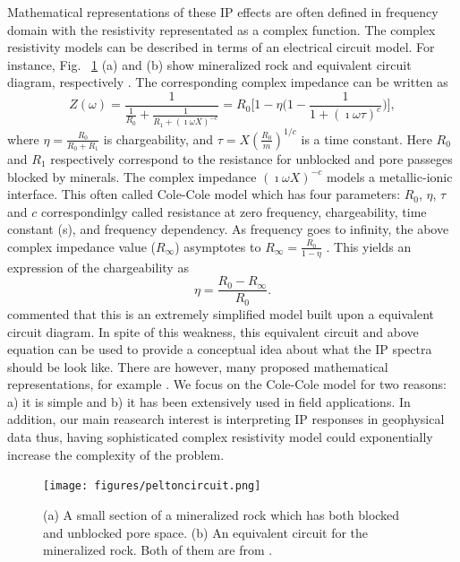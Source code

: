 \documentclass[letterpaper,11pt]{article}
\begin{document}
Mathematical representations of these IP effects are often defined in frequency domain with the resistivity representated as a complex function. The complex resistivity models can be described in terms of an electrical circuit model. For instance, Fig. ~\ref{Fig:peltoncircuit} (a) and (b) show mineralized rock and equivalent circuit diagram, respectively \cite{Pelton1978}. The corresponding complex impedance can be written as 
\begin{equation}
  Z(\omega) = \frac{1}{\frac{1}{R_0}+\frac{1}{R_1+(\imath\omega X)^{-c}}}=R_0 \Big[1 - \eta \Big(1-\frac{1}{1+(\imath\omega\tau)^c}\Big) \Big],
\end{equation}
where $\eta = \frac{R_0}{R_0+R_1}$ is chargeability, and $\tau=X(\frac{R_0}{m})^{1/c}$ is a time constant. Here $R_0$ and $R_1$ respectively correspond to the resistance for unblocked and pore passeges blocked by minerals. The complex impedance $(\imath \omega X)^{-c}$ models a metallic-ionic interface. This often called Cole-Cole model which has four parameters: $R_0$, $\eta$, $\tau$ and $c$ correspondinlgy called resistance at zero frequency, chargeability, time constant (s), and frequency dependency. As frequency goes to infinity, the above complex impedance value ($R_{\infty}$) asymptotes to $R_{\infty} = \frac{R_0}{1-\eta}$ . This yields an expression of the chargeability as 
\begin{equation}
  \eta = \frac{R_0-R_{\infty}}{R_0}.
\end{equation}
\cite{Pelton1978} commented that this is an extremely simplified model built upon a equivalent circuit diagram. In spite of this weakness, this equivalent circuit and above equation can be used to provide a conceptual idea about what the IP spectra should be look like. There are however, many proposed mathematical representations, for example  \cite[]{Dias2000}. We focus on the Cole-Cole model for two reasons: a) it is simple and b) it has been extensively used in field applications. In addition, our main reasearch interest is interpreting IP responses in geophysical data thus, having sophisticated complex resistivity model could exponentially increase the complexity of the problem. 

\begin{figure}[htb]
  \centering
  \texttt{[image: figures/peltoncircuit.png]}
  \caption{(a) A small section of a mineralized rock which has both blocked and unblocked pore space. (b) An equivalent circuit for the mineralized rock. Both of them are from \cite{Pelton1978}. }
  \label{Fig:peltoncircuit}
\end{figure}
\end{document}

